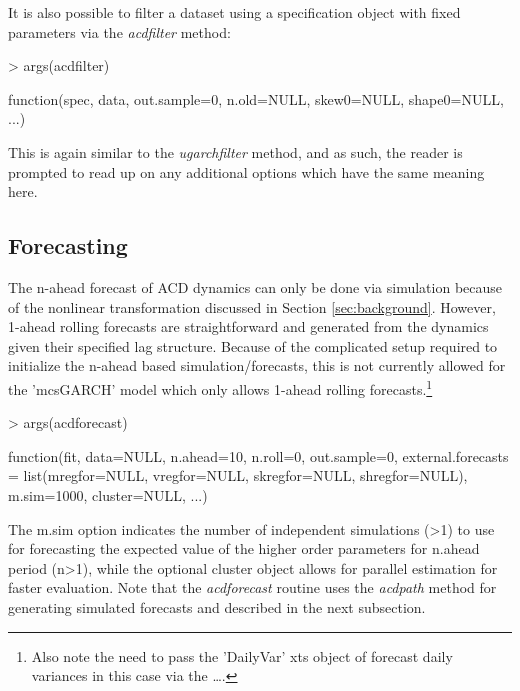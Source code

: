 It is also possible to filter a dataset using a specification object with fixed parameters via the \emph{acdfilter} method:
\begin{Schunk}
\begin{Sinput}
> args(acdfilter)
\end{Sinput}
\begin{Soutput}
function(spec, data, out.sample=0,  n.old=NULL, skew0=NULL, shape0=NULL, ...)
\end{Soutput}
\end{Schunk}
This is again similar to the \emph{ugarchfilter} method, and as such, the reader is prompted to read up on any additional options which have the same meaning here.
\subsection{Forecasting}
The n-ahead forecast of ACD dynamics can only be done via simulation because of the nonlinear transformation discussed in Section \ref{sec:background}. However, 1-ahead rolling forecasts are straightforward and generated from the dynamics given their specified lag structure. Because of the complicated setup required to initialize the n-ahead based simulation/forecasts, this is not currently allowed for the 'mcsGARCH' model which only allows 1-ahead rolling forecasts.\footnote{Also note the need to pass the 'DailyVar' xts object of forecast daily variances in this case via the \dots.}
\begin{Schunk}
\begin{Sinput}
> args(acdforecast)
\end{Sinput}
\begin{Soutput}
function(fit, data=NULL, n.ahead=10, n.roll=0, out.sample=0,
external.forecasts = list(mregfor=NULL, vregfor=NULL,
skregfor=NULL, shregfor=NULL), m.sim=1000, cluster=NULL, ...)
\end{Soutput}
\end{Schunk}
The m.sim option indicates the number of independent simulations (>1) to use for forecasting the expected value of the higher order parameters for n.ahead period (n>1), while the
optional cluster object allows for parallel estimation for faster evaluation. Note that the \emph{acdforecast} routine uses the \emph{acdpath} method for generating simulated
forecasts and described in the next subsection.
